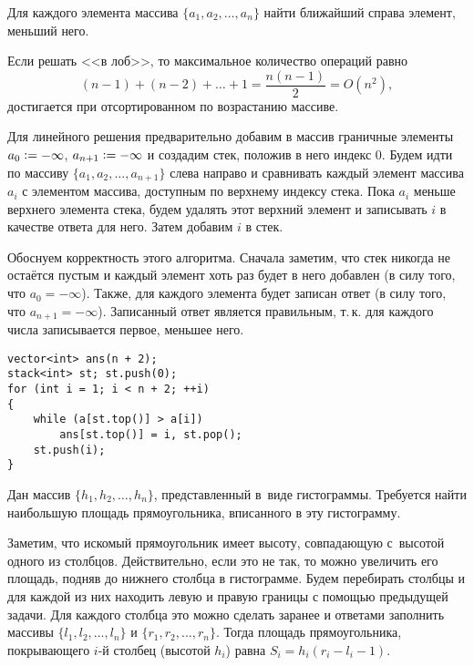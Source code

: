 \begin{problem}
    Для каждого элемента массива $\{a_1, a_2, \ldots, a_n\}$ найти ближайший справа элемент, меньший него.
\end{problem}

Если решать <<в лоб>>, то максимальное количество операций равно 
\[(n - 1) + (n - 2) + \ldots + 1 = \frac{n(n - 1)}{2} = O(n^2),\]
достигается при отсортированном по возрастанию массиве.

Для линейного решения предварительно добавим в массив граничные элементы $a_0 \vcentcolon = -\infty$, $a_{n + 1} \vcentcolon = -\infty$ и создадим стек, положив в него индекс $0$. Будем идти по массиву $\{a_1, a_2, \ldots, a_{n + 1}\}$ слева направо и \mbox{сравнивать} каждый элемент массива $a_i$ с элементом массива, доступным по \mbox{верхнему} индексу стека. Пока $a_i$ меньше верхнего элемента стека, будем удалять этот верхний элемент и записывать $i$ в качестве ответа для него. Затем добавим $i$ в стек.

Обоснуем корректность этого алгоритма. Сначала заметим, что стек никогда не остаётся пустым и каждый элемент хоть раз будет в него добавлен (в силу того, что $a_0 = -\infty$). Также, для каждого элемента будет записан ответ (в силу того, что $a_{n + 1} = -\infty$). Записанный ответ является правильным, т.\,к. для каждого числа записывается первое, меньшее него.

\begin{verbatim}
vector<int> ans(n + 2);
stack<int> st; st.push(0);
for (int i = 1; i < n + 2; ++i)
{
    while (a[st.top()] > a[i])
        ans[st.top()] = i, st.pop();
    st.push(i);
}
\end{verbatim}

\begin{problem}[Гистограмма]
    Дан массив $\{h_1, h_2, \ldots, h_n\}$, представленный в~виде гистограммы. Требуется найти наибольшую площадь прямоугольника, вписанного в эту гистограмму.
\end{problem}

Заметим, что искомый прямоугольник имеет высоту, совпадающую с~высотой одного из столбцов. Действительно, если это не так, то можно увеличить его площадь, подняв до нижнего столбца в гистограмме. Будем перебирать столбцы и для каждой из них находить левую и правую границы с помощью предыдущей задачи. Для каждого столбца это можно сделать заранее и ответами заполнить \mbox{массивы} $\{l_1, l_2, \ldots, l_n\}$ и $\{r_1, r_2, \ldots, r_n\}$. Тогда площадь прямоугольника, покрывающего $i$-й столбец (высотой $h_i$) равна $S_i = h_i(r_i - l_i - 1)$.

